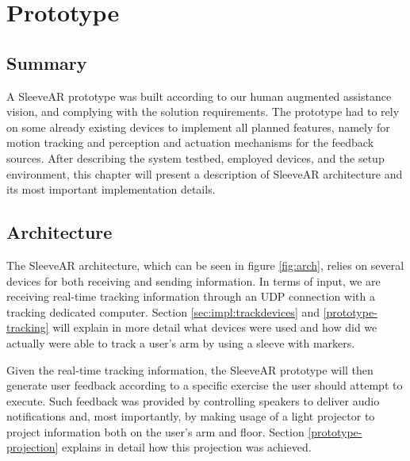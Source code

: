 \chapter{Prototype}
\label{sec:implementation}

\section*{Summary}
A SleeveAR prototype was built according to our human augmented assistance vision, and complying with the solution requirements.
The prototype had to rely on some already existing devices to implement all planned features, namely for motion tracking and perception and actuation mechanisms for the feedback sources. After describing the system testbed, employed devices, and the setup environment, this chapter will present a description of SleeveAR architecture and its most important implementation details.

\section{Architecture}
\label{sec:impl:arch}

The SleeveAR architecture, which can be seen in figure \ref{fig:arch}, relies on several devices for both receiving and sending information.
In terms of input, we are receiving real-time tracking information through an UDP connection with a tracking dedicated computer. Section \ref{sec:impl:trackdevices} and \ref{prototype-tracking} will explain in more detail what devices were used and how did we actually were able to track a user's arm by using a sleeve with markers.

Given the real-time tracking information, the SleeveAR prototype will then generate user feedback according to a specific exercise the user should attempt to execute. Such feedback was provided by controlling speakers to deliver audio notifications and, most importantly, by making usage of a light projector to project information both on the user's arm and floor. Section \ref{prototype-projection} explains in detail how this projection was achieved.

